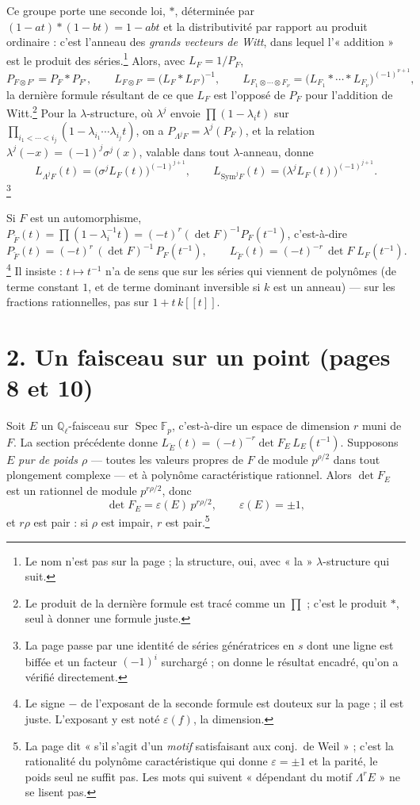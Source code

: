 \documentclass[11pt,a4paper]{article}
\begin{document}
Ce groupe porte une seconde loi, $*$, déterminée par
$(1 - at) * (1 - bt) = 1 - abt$ et la distributivité par rapport au produit
ordinaire : c'est l'anneau des \emph{grands vecteurs de Witt}, dans lequel
l'« addition » est le produit des séries.\footnote{Le nom n'est pas sur la
page ; la structure, oui, avec « la » $\lambda$-structure qui suit.} Alors,
avec $L_F = 1/P_F$,
\[
  P_{F \otimes F'} = P_F * P_{F'}, \qquad
  L_{F \otimes F'} = \bigl(L_F * L_{F'}\bigr)^{-1}, \qquad
  L_{F_1 \otimes \cdots \otimes F_\nu} = \bigl(L_{F_1} * \cdots * L_{F_\nu}\bigr)^{(-1)^{\nu+1}},
\]
la dernière formule résultant de ce que $L_F$ est l'opposé de $P_F$ pour
l'addition de Witt.\footnote{Le produit de la dernière formule est tracé
comme un $\prod$ ; c'est le produit $*$, seul à donner une formule juste.}
Pour la $\lambda$-structure, où $\lambda^j$ envoie $\prod(1 - \lambda_i t)$ sur
$\prod_{i_1 < \cdots < i_j}(1 - \lambda_{i_1}\cdots\lambda_{i_j}t)$, on a
$P_{\Lambda^j F} = \lambda^j(P_F)$, et la relation $\lambda^j(-x) =
(-1)^j\sigma^j(x)$, valable dans tout $\lambda$-anneau, donne
\[
  L_{\Lambda^j F}(t) = \bigl(\sigma^j L_F(t)\bigr)^{(-1)^{j+1}}, \qquad
  L_{\mathrm{Sym}^j F}(t) = \bigl(\lambda^j L_F(t)\bigr)^{(-1)^{j+1}} .
\]
\footnote{La page passe par une identité de séries génératrices en $s$ dont
une ligne est biffée et un facteur $(-1)^i$ surchargé ; on donne le résultat
encadré, qu'on a vérifié directement.}

Si $F$ est un automorphisme,
$P_{\check F}(t) = \prod(1 - \lambda_i^{-1}t) = (-t)^r(\det F)^{-1}P_F(t^{-1})$,
c'est-à-dire
\[
  P_{\check F}(t) = (-t)^{r}\,(\det F)^{-1}\,P_F(t^{-1}), \qquad
  L_{\check F}(t) = (-t)^{-r}\,\det F\; L_F(t^{-1}) .
\]
\footnote{Le signe $-$ de l'exposant de la seconde formule est douteux sur la
page ; il est juste. L'exposant y est noté $\varepsilon(f)$, la dimension.}
Il insiste : $t \mapsto t^{-1}$ n'a de sens que sur les séries qui viennent de
polynômes (de terme constant $1$, et de terme dominant inversible si $k$ est
un anneau) --- sur les fractions rationnelles, pas sur $1 + t\,k[[t]]$.

\section*{2. Un faisceau sur un point (pages 8 et 10)}

Soit $E$ un $\mathbb{Q}_\ell$-faisceau sur $\operatorname{Spec}\mathbb{F}_p$,
c'est-à-dire un espace de dimension $r$ muni de $F$. La section précédente donne
$L_{\check E}(t) = (-t)^{-r}\det F_E\,L_E(t^{-1})$. Supposons $E$ \emph{pur de
poids $\rho$} --- toutes les valeurs propres de $F$ de module $p^{\rho/2}$ dans
tout plongement complexe --- et à polynôme caractéristique rationnel. Alors
$\det F_E$ est un rationnel de module $p^{r\rho/2}$, donc
\[
  \det F_E = \varepsilon(E)\, p^{r\rho/2}, \qquad \varepsilon(E) = \pm 1,
\]
et $r\rho$ est pair : si $\rho$ est impair, $r$ est pair.\footnote{La
page dit « s'il s'agit d'un \emph{motif} satisfaisant aux conj.\ de Weil » ;
c'est la rationalité du polynôme caractéristique qui donne $\varepsilon = \pm 1$
et la parité, le poids seul ne suffit pas. Les mots qui suivent « dépendant du
motif $\Lambda^r E$ » ne se lisent pas.}
\end{document}
